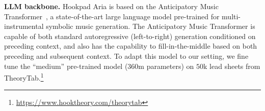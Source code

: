 \documentclass{article}
\newcommand\sysname{Hookpad Aria}
\newcommand{\chris}[1]{{\color{magenta}[CD: #1]}}
\begin{document}
\vspace{2mm}
\noindent \textbf{LLM backbone.}
\sysname{} is based on the Anticipatory Music Transformer~\cite{thickstun2023anticipatory}, a state-of-the-art large language model pre-trained for multi-instrumental symbolic music generation.
The Anticipatory Music Transformer is capable of both standard autoregressive (left-to-right) generation conditioned on preceding context, 
and also has the capability to fill-in-the-middle based on both preceding and subsequent context. 
To adapt this model to our setting, we fine tune the ``medium'' pre-trained model ($360$m parameters) on $50$k lead sheets from TheoryTab.\footnote{\url{https://www.hooktheory.com/theorytab}}


\end{document}
